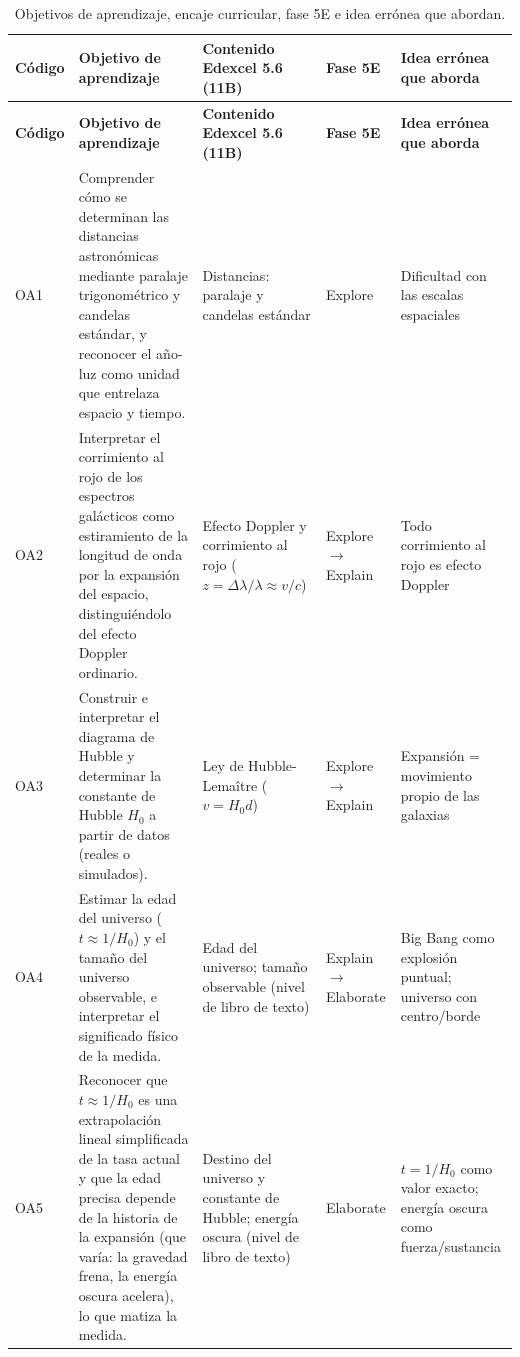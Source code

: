 \setlength{\tabcolsep}{3pt}
\begin{longtable}{>{\raggedright\arraybackslash}p{0.9cm} >{\raggedright\arraybackslash}p{5.3cm} >{\raggedright\arraybackslash}p{3.0cm} >{\raggedright\arraybackslash}p{1.5cm} >{\raggedright\arraybackslash}p{3.6cm}}
\caption{Objetivos de aprendizaje, encaje curricular, fase 5E e idea errónea que abordan.}\label{tab:oa}\\
\rowcolor{naranja}
{\color{white}\textbf{Código}} & {\color{white}\textbf{Objetivo de aprendizaje}} & {\color{white}\textbf{Contenido Edexcel 5.6 (11B)}} & {\color{white}\textbf{Fase 5E}} & {\color{white}\textbf{Idea errónea que aborda}} \\ \hline
\endfirsthead
\rowcolor{naranja}
{\color{white}\textbf{Código}} & {\color{white}\textbf{Objetivo de aprendizaje}} & {\color{white}\textbf{Contenido Edexcel 5.6 (11B)}} & {\color{white}\textbf{Fase 5E}} & {\color{white}\textbf{Idea errónea que aborda}} \\ \hline
\endhead
OA1 & Comprender cómo se determinan las distancias astronómicas mediante paralaje trigonométrico y candelas estándar, y reconocer el año-luz como unidad que entrelaza espacio y tiempo. & Distancias: paralaje y candelas estándar & Explore & Dificultad con las escalas espaciales \\ \hline
OA2 & Interpretar el corrimiento al rojo de los espectros galácticos como estiramiento de la longitud de onda por la expansión del espacio, distinguiéndolo del efecto Doppler ordinario. & Efecto Doppler y corrimiento al rojo ($z = \Delta\lambda/\lambda \approx v/c$) & Explore $\rightarrow$ Explain & Todo corrimiento al rojo es efecto Doppler \\ \hline
OA3 & Construir e interpretar el diagrama de Hubble y determinar la constante de Hubble $H_{0}$ a partir de datos (reales o simulados). & Ley de Hubble-Lemaître ($v = H_{0}d$) & Explore $\rightarrow$ Explain & Expansión = movimiento propio de las galaxias \\ \hline
OA4 & Estimar la edad del universo ($t \approx 1/H_{0}$) y el tamaño del universo observable, e interpretar el significado físico de la medida. & Edad del universo; tamaño observable (nivel de libro de texto) & Explain $\rightarrow$ Elaborate & Big Bang como explosión puntual; universo con centro/borde \\ \hline
OA5 & Reconocer que $t \approx 1/H_{0}$ es una extrapolación lineal simplificada de la tasa actual y que la edad precisa depende de la historia de la expansión (que varía: la gravedad frena, la energía oscura acelera), lo que matiza la medida. & Destino del universo y constante de Hubble; energía oscura (nivel de libro de texto) & Elaborate & $t = 1/H_{0}$ como valor exacto; energía oscura como fuerza/sustancia \\ \hline

\end{longtable}
